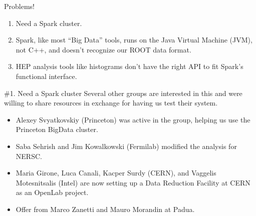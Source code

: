 \documentclass{beamer}
\begin{document}
\begin{frame}{Problems!}
\Large

\begin{enumerate}\setlength{\itemsep}{0.5 cm}
\item Need a Spark cluster.

\item Spark, like most ``Big Data'' tools, runs on the Java Virtual Machine (JVM), not C++, and doesn't recognize our ROOT data format.

\item HEP analysis tools like histograms don't have the right API to fit Spark's functional interface.

\end{enumerate}
\end{frame}

\begin{frame}{\#1. Need a Spark cluster}
Several other groups are interested in this and were willing to share resources in exchange for having us test their system.

\begin{itemize}
\item Alexey Svyatkovskiy (Princeton) was active in the group, helping us use the Princeton BigData cluster.
\item Saba Sehrish and Jim Kowalkowski (Fermilab) modified the analysis for NERSC.
\item Maria Girone, Luca Canali, Kacper Surdy (CERN), and Vaggelis Motesnitsalis (Intel) are now setting up a Data Reduction Facility at CERN as an OpenLab project.
\item Offer from Marco Zanetti and Mauro Morandin at Padua.
\end{itemize}
\end{frame}
\end{document}
